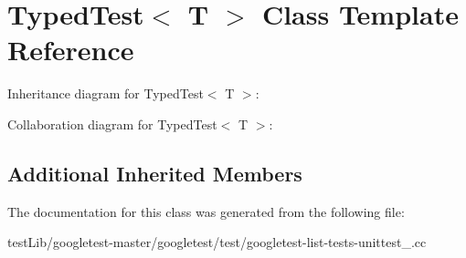 \hypertarget{classTypedTest}{}\section{Typed\+Test$<$ T $>$ Class Template Reference}
\label{classTypedTest}


Inheritance diagram for Typed\+Test$<$ T $>$\+:


Collaboration diagram for Typed\+Test$<$ T $>$\+:
\subsection*{Additional Inherited Members}


The documentation for this class was generated from the following file\+:\begin{DoxyCompactItemize}
\item 
test\+Lib/googletest-\/master/googletest/test/googletest-\/list-\/tests-\/unittest\+\_\+.\+cc\end{DoxyCompactItemize}
